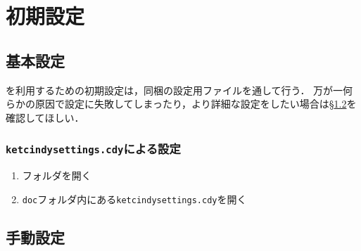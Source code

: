 
\chapter{初期設定}

\section{基本設定}

{\ketcindy}を利用するための初期設定は，同梱の設定用ファイルを通して行う．
万が一何らかの原因で設定に失敗してしまったり，より詳細な設定をしたい場合は{\S}\ref{sec:manual-settings}を確認してほしい．

\cprotect\subsection{\verb|ketcindysettings.cdy|による設定}
\begin{enumerate}
    \item {\ketcindy}フォルダを開く
    \item \verb|doc|フォルダ内にある\verb|ketcindysettings.cdy|を開く
\end{enumerate}


\section{手動設定}
\label{sec:manual-settings}